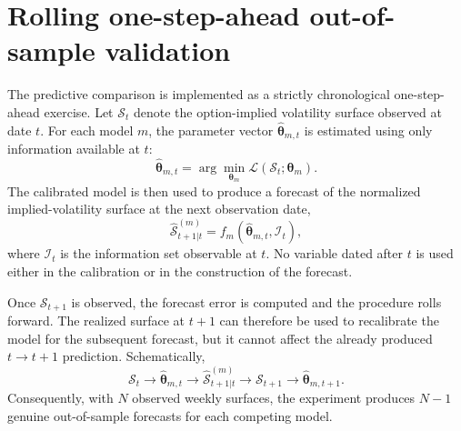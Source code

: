 %

\section{Rolling one-step-ahead out-of-sample validation}
\label{sec:rolling_oos}

The predictive comparison is implemented as a strictly chronological
one-step-ahead exercise.  Let $\mathcal{S}_t$ denote the option-implied
volatility surface observed at date $t$.  For each model $m$, the parameter
vector $\widehat{\boldsymbol{\theta}}_{m,t}$ is estimated using only information
available at $t$:
\begin{equation}
    \widehat{\boldsymbol{\theta}}_{m,t}
    =
    \arg\min_{\boldsymbol{\theta}_m}
    \mathcal{L}
    \left(
        \mathcal{S}_t;
        \boldsymbol{\theta}_m
    \right).
\end{equation}
The calibrated model is then used to produce a forecast of the normalized
implied-volatility surface at the next observation date,
\begin{equation}
    \widehat{\mathcal{S}}^{(m)}_{t+1|t}
    =
    f_m
    \left(
        \widehat{\boldsymbol{\theta}}_{m,t},
        \mathcal{I}_t
    \right),
\end{equation}
where $\mathcal{I}_t$ is the information set observable at $t$.  No variable
dated after $t$ is used either in the calibration or in the construction of the
forecast.

Once $\mathcal{S}_{t+1}$ is observed, the forecast error is computed and the
procedure rolls forward.  The realized surface at $t+1$ can therefore be used
to recalibrate the model for the subsequent forecast, but it cannot affect the
already produced $t\rightarrow t+1$ prediction.  Schematically,
\begin{equation}
    \mathcal{S}_t
    \longrightarrow
    \widehat{\boldsymbol{\theta}}_{m,t}
    \longrightarrow
    \widehat{\mathcal{S}}^{(m)}_{t+1|t}
    \longrightarrow
    \mathcal{S}_{t+1}
    \longrightarrow
    \widehat{\boldsymbol{\theta}}_{m,t+1}.
\end{equation}
Consequently, with $N$ observed weekly surfaces, the experiment produces
$N-1$ genuine out-of-sample forecasts for each competing model.


